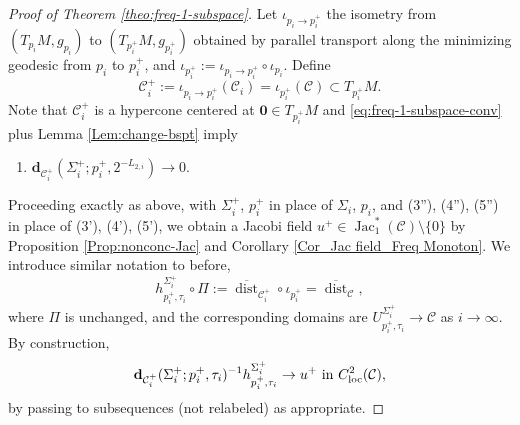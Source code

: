 \documentclass[11pt, letterpaper, reqno]{amsart}
\numberwithin{equation}{section}
\theoremstyle{remark}
\newcommand{\cC}{\mathcal{C}}
\newcommand{\mbfd}{\mathbf{d}}
\newcommand{\dist}{\operatorname{dist}}
\newcommand{\Jac}{\operatorname{Jac}}
\newcommand{\Sdist}{\overline{\dist}}
\newcommand{\orig}{\mathbf{0}}
\begin{document}
\begin{proof}[Proof of Theorem \ref{theo:freq-1-subspace}]
Let $\iota_{p_i \to p_i^+}$ the isometry from $(T_{p_i} M, g_{p_i})$ to $(T_{p_i^+} M, g_{p_i^+})$ obtained by parallel transport along the minimizing geodesic from $p_i$ to $p_i^+$, and $ \iota_{p_i^+} := \iota_{p_i \to p_i^+} \circ \iota_{p_i}$. Define
\[ \cC_i^+ := \iota_{p_i \to p_i^+}(\cC_i) = \iota_{p_i^+}(\cC) \subset T_{p_i^+} M. \]
Note that $\cC_i^+$ is a hypercone centered at $\orig \in T_{p_i^+}M$ and \eqref{eq:freq-1-subspace-conv} plus Lemma \ref{Lem:change-bspt} imply
\begin{enumerate}
	\item[(3'')] $\mbfd_{\cC_i^+}(\Sigma_i^+; p_i^+, 2^{-L_{2,i}}) \to 0$.
\end{enumerate} 
Proceeding exactly as above, with $\Sigma_i^+$, $p_i^+$ in place of $\Sigma_i$, $p_i$, and (3''), (4''), (5'') in place of (3'), (4'), (5'), we obtain a Jacobi field $u^+ \in \Jac^*_1(\cC) \setminus \{ 0 \}$ by Proposition \ref{Prop:nonconc-Jac} and Corollary \ref{Cor_Jac field_Freq Monoton}. We introduce similar notation to before,
\[ h_{p_i^+, \tau_i}^{\Sigma_i^+} \circ \Pi := \Sdist_{\cC^+_i} \circ \iota_{p_i^+} = \Sdist_{\cC}, \]
where $\Pi$ is unchanged, and the corresponding domains are $U^{\Sigma_i^+}_{p_i^+, \tau_i} \to \cC$ as $i \to \infty$. By construction,
\begin{equation} \label{eq:freq-1-subspace-up}
	\mbfd_{\cC^+_i}(\Sigma^+_i; p^+_i, \tau_i)^{-1} h_{p_i^+, \tau_i}^{\Sigma_i^+} \to u^+ \text{ in } C^2_{\textnormal{loc}}(\cC),
\end{equation}
by passing to subsequences (not relabeled) as appropriate. 


\end{proof}
\end{document}
